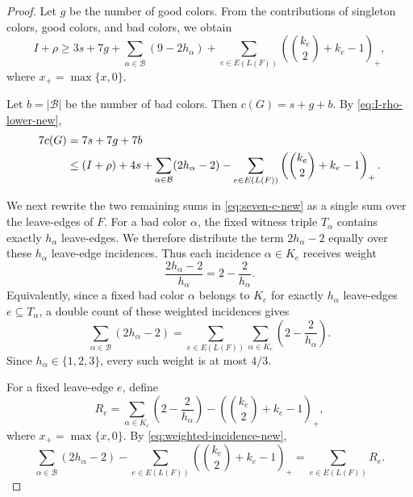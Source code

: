 \documentclass[10pt,a4paper]{amsart}
\newcommand{\cB}{\mathcal{B}}
\begin{document}
\begin{proof}
    Let $g$ be the number of good colors.  From the contributions of singleton
    colors, good colors, and bad colors, we obtain
    \begin{equation}\label{eq:I-rho-lower-new}
        I+\rho
        \ge
        3s+7g
        +
        \sum_{\alpha\in\cB}(9-2h_\alpha)
        +
        \sum_{e\in E(L(F))}
        \left(\binom{k_e}{2}+k_e-1\right)_+,
    \end{equation}
    where $x_+=\max\{x,0\}$.

    Let $b=|\cB|$ be the number of bad colors.  Then $c(G)=s+g+b$.
    By \eqref{eq:I-rho-lower-new},
    \begin{align}
        7c(G)
         & =
        7s+7g+7b \notag \\
         & \le
        (I+\rho)+4s
        +
        \sum_{\alpha\in\cB}(2h_\alpha-2)
        -
        \sum_{e\in E(L(F))}
        \left(\binom{k_e}{2}+k_e-1\right)_+.
        \label{eq:seven-c-new}
    \end{align}

    We next rewrite the two remaining sums in \eqref{eq:seven-c-new} as a
    single sum over the leave-edges of \(F\).  For a bad color \(\alpha\), the
    fixed witness triple \(T_\alpha\) contains exactly \(h_\alpha\)
    leave-edges.  We therefore distribute the term \(2h_\alpha-2\) equally
    over these \(h_\alpha\) leave-edge incidences.  Thus each incidence
    \(\alpha\in K_e\) receives weight
    \[
        \frac{2h_\alpha-2}{h_\alpha}
        =
        2-\frac2{h_\alpha}.
    \]
    Equivalently, since a fixed bad color \(\alpha\) belongs to \(K_e\) for
    exactly \(h_\alpha\) leave-edges \(e\subseteq T_\alpha\), a double count
    of these weighted incidences gives
    \begin{equation}\label{eq:weighted-incidence-new}
        \sum_{\alpha\in\cB}(2h_\alpha-2)
        =
        \sum_{e\in E(L(F))}
        \sum_{\alpha\in K_e}
        \left(2-\frac2{h_\alpha}\right).
    \end{equation}
    Since \(h_\alpha\in\{1,2,3\}\), every such weight is at most \(4/3\).

    For a fixed leave-edge \(e\), define
    \[
        R_e=
        \sum_{\alpha\in K_e}
        \left(2-\frac2{h_\alpha}\right)
        -
        \left(\binom{k_e}{2}+k_e-1\right)_+,
    \]
    where $x_+=\max\{x,0\}$.
    By \eqref{eq:weighted-incidence-new},
    \begin{equation}
        \sum_{\alpha\in\cB}(2h_\alpha-2)
        -
        \sum_{e\in E(L(F))}
        \left(\binom{k_e}{2}+k_e-1\right)_+
        =
        \sum_{e\in E(L(F))}R_e.
    \end{equation}



\end{proof}
\end{document}
